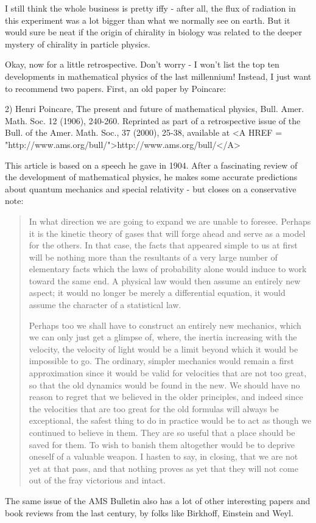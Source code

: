 I still think the whole business is pretty iffy - after all, the flux of
radiation in this experiment was a lot bigger than what we normally see
on earth.  But it would sure be neat if the origin of chirality in
biology was related to the deeper mystery of chirality in particle physics.

Okay, now for a little retrospective.  Don't worry - I won't list the
top ten developments in mathematical physics of the last millennium!
Instead, I just want to recommend two papers.  First, an old paper by 
Poincare: 

2) Henri Poincare, The present and future of mathematical physics,
Bull. Amer. Math. Soc. 12 (1906), 240-260.  Reprinted as part of a
retrospective issue of the Bull. of the Amer. Math. Soc., 37 (2000), 
25-38, available 
at <A HREF = "http://www.ams.org/bull/">http://www.ams.org/bull/</A>

This article is based on a speech he gave in 1904.   After a
fascinating review of the development of mathematical physics, 
he makes some accurate predictions about quantum mechanics and 
special relativity - but closes on a conservative note: 

\begin{quote}
     In what direction we are going to expand we are unable to foresee.  
     Perhaps it is the kinetic theory of gases that will forge ahead 
     and serve as a model for the others.  In that case, the facts  
     that appeared simple to us at first will be nothing more than
     the resultants of a very large number of elementary facts which 
     the laws of probability alone would induce to work toward the 
     same end.  A physical law would then assume an entirely new aspect; 
     it would no longer be merely a differential equation, it would 
     assume the character of a statistical law. 

     Perhaps too we shall have to construct an entirely new mechanics, 
     which we can only just get a glimpse of, where, the inertia 
     increasing with the velocity, the velocity of light would be a 
     limit beyond which it would be impossible to go. The ordinary, 
     simpler mechanics would remain a first approximation since it 
     would be valid for velocities that are not too great, so that 
     the old dynamics would be found in the new.  We should have no 
     reason to regret that we believed in the older principles, and 
     indeed since the velocities that are too great for the old 
     formulas will always be exceptional, the safest thing to do in 
     practice would be to act as though we continued to believe in 
     them.  They are so useful that a place should be saved for them. 
     To wish to banish them altogether would be to deprive oneself of 
     a valuable weapon. I hasten to say, in closing, that we are not 
     yet at that pass, and that nothing proves as yet that they will 
     not come out of the fray victorious and intact.

\end{quote}
The same issue of the AMS Bulletin also has a lot of other interesting
papers and book reviews from the last century, by folks like Birkhoff, 
Einstein and Weyl.

